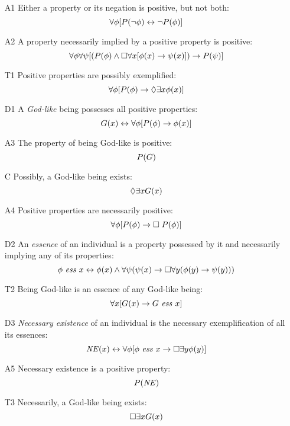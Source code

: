 \documentclass{birkjour}
\theoremstyle{definition}
\theoremstyle{remark}
\numberwithin{equation}{section}
\begin{document}
\begin{appendix}
\begin{itemize}
\item[A1] Either a property or its negation is positive, but not
  both:
  $$\forall \phi [P(\neg \phi) \leftrightarrow \neg P(\phi)]$$ 
\item[A2] A property necessarily implied by a
  positive property is positive:
  $$\forall \phi \forall \psi [(P(\phi) \wedge \Box \forall x [\phi(x)
  \rightarrow \psi(x)]) \rightarrow P(\psi)]$$
\item[T1] Positive properties are possibly exemplified: 
  $$\forall \phi [P(\phi) \rightarrow \Diamond \exists x \phi(x)]$$ 
\item[D1] A \emph{God-like} being possesses all positive properties: 
  $$G(x) \leftrightarrow \forall \phi [P(\phi) \rightarrow \phi(x)]$$ 
\item[A3]  The property of being God-like is positive: 
  $$P(G)$$
\item[C\phantom{1}] Possibly, a God-like being exists: $$\Diamond \exists x G(x)$$
\item[A4]  Positive properties are necessarily positive: 
  $$\forall \phi [P(\phi) \rightarrow \Box \; P(\phi)]$$ 
\item[D2] An \emph{essence} of an individual is a property possessed by it and necessarily implying any of its properties: $$\phi \ \mathit{ess} \ x \leftrightarrow \phi(x) \wedge \forall
  \psi (\psi(x) \rightarrow \Box \forall y (\phi(y) \rightarrow \psi(y)))$$ 
\item[T2]  Being God-like is an essence of any
  God-like being: $$\forall x [G(x) \rightarrow G \ \mathit{ess} \ x]$$
\item[D3] \emph{Necessary existence} of an individual is the necessary exemplification of all its essences: 
  $$\mathit{NE}(x) \leftrightarrow \forall \phi [\phi \ \mathit{ess} \ x \rightarrow \Box
  \exists y \phi(y)]$$
\item[A5] Necessary existence is a positive property: $$P(\mathit{NE})$$ 
\item[T3] Necessarily, a God-like being exists: $$\Box \exists x G(x)$$ 
\end{itemize}

\end{appendix}


\end{document}
